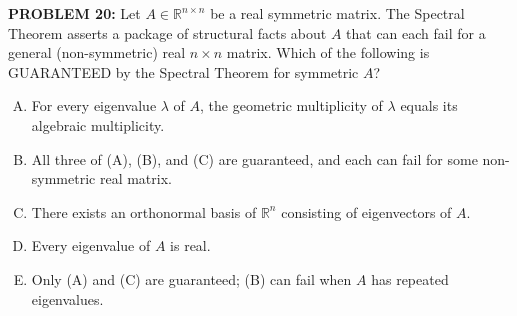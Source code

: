 \documentclass[12pt]{amsart}
\begin{document}
{\bf PROBLEM 20:}
Let $A \in \mathbb{R}^{n \times n}$ be a real symmetric matrix. The Spectral
Theorem asserts a package of structural facts about $A$ that can each fail
for a general (non-symmetric) real $n \times n$ matrix. Which of the
following is GUARANTEED by the Spectral Theorem for symmetric $A$?

\begin{enumerate}[(A)]
\item For every eigenvalue $\lambda$ of $A$, the geometric multiplicity of $\lambda$ equals its algebraic multiplicity.
\item All three of (A), (B), and (C) are guaranteed, and each can fail for some non-symmetric real matrix.
\item There exists an orthonormal basis of $\mathbb{R}^n$ consisting of eigenvectors of $A$.
\item Every eigenvalue of $A$ is real.
\item Only (A) and (C) are guaranteed; (B) can fail when $A$ has repeated eigenvalues.
\end{enumerate}
\end{document}
